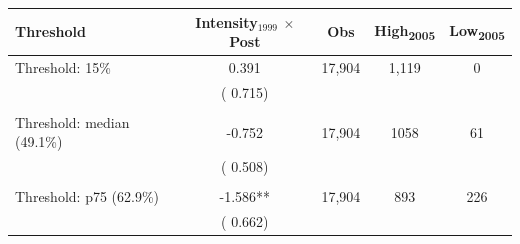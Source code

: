 \begin{tabular}{lcccc} \hline \hline
Threshold & Intensity$_{1999}$ $\times$ Post & Obs & High\textsubscript{2005} & Low\textsubscript{2005} \\ \toprule
Threshold: 15\% & 0.391 &       17,904 & 1,119 & 0 \\ 
 & (    0.715) & & & \\ 
  & & & & \\ 
Threshold: median (49.1\%) & -0.752 &       17,904 & 1058 & 61 \\ 
 & (    0.508) & & & \\ 
  & & & & \\ 
Threshold: p75 (62.9\%) & -1.586** &       17,904 & 893 & 226 \\ 
 & (    0.662) & & & \\ 
\bottomrule
\end{tabular}